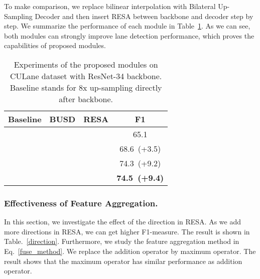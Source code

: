 \documentclass[letterpaper]{article} \usepackage{aaai21}  \usepackage{times}  \usepackage{helvet} \usepackage{courier}  \usepackage[hyphens]{url}  \usepackage{graphicx} \urlstyle{rm} \def\UrlFont{\rm}  \usepackage{natbib}  \usepackage{caption} \frenchspacing  \setlength{\pdfpagewidth}{8.5in}  \setlength{\pdfpageheight}{11in}  \usepackage{amsmath}
\begin{document}
To make comparison, we replace bilinear interpolation with Bilateral Up-Sampling Decoder and then insert RESA between backbone and decoder step by step. We summarize the performance of each module in Table~\ref{tab:Module ablation}. As we can see, both modules can strongly improve lane detection performance, which proves the capabilities of proposed modules.

\begin{table}[!tbh]
	\centering
	\begin{tabular}{cccc}
			\toprule
			Baseline & BUSD & RESA & F1 \\ \midrule
			\checkmark& & & 65.1 \\
			& \checkmark & & 68.6~(+3.5) \\
			& & \checkmark & 74.3~(+9.2) \\
			& \checkmark &\checkmark & \textbf{74.5~(+9.4)} \\ \bottomrule
	\end{tabular}
	\caption{Experiments of the proposed modules on CULane dataset with ResNet-34 backbone. Baseline stands for 8x up-sampling directly after backbone.}
	\label{tab:Module ablation}
	\vspace{-10pt}
\end{table}

\subsubsection{Effectiveness of Feature Aggregation.}
In this section, we investigate the effect of the direction in RESA.
As we add more directions in RESA, we can get higher F1-measure. 
The result is shown in Table.~\ref{direction}.
Furthermore, we study the feature aggregation method in Eq.~\ref{fuse_method}.
We replace the addition operator by maximum operator. The result shows that the maximum operator has similar performance as addition operator.

\begin{table}[!tbh]
\centering
{}
\caption{Effectiveness of feature aggregation of RESA on
CULane dataset with ResNet-34 backbone.
 means maximum feature aggregation method.
}
\label{direction}
\vspace{-10pt}
\end{table}
\end{document}
